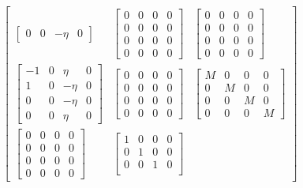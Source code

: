 \documentclass[11pt]{article} %
\begin{document}
\begin{align}
\begin{bmatrix}
\begin{bmatrix}
            0 & 0 & -\eta & 0
        \end{bmatrix}  & 
        \begin{bmatrix}
            0 & 0 & 0 & 0\\
            0 & 0 & 0 & 0\\
            0 & 0 & 0 & 0\\
            0 & 0 & 0 & 0
        \end{bmatrix}   &
        \begin{bmatrix}
            0 & 0 & 0 & 0\\
            0 & 0 & 0 & 0\\
            0 & 0 & 0 & 0\\
            0 & 0 & 0 & 0
        \end{bmatrix} \\
        \begin{bmatrix}
            -1 & 0 & \eta  & 0\\
            1 & 0 & -\eta & 0\\
            0 & 0 & -\eta & 0\\
            0 & 0 & \eta & 0
        \end{bmatrix}  & 
        \begin{bmatrix}
            0 & 0 & 0 & 0\\
            0 & 0 & 0 & 0\\
            0 & 0 & 0 & 0\\
            0 & 0 & 0 & 0
        \end{bmatrix}   &
        \begin{bmatrix}
            M & 0 & 0 & 0\\
            0 & M & 0 & 0\\
            0 & 0 & M & 0\\
            0 & 0 & 0 & M
        \end{bmatrix} \\
        \begin{bmatrix}
            0 & 0 & 0 & 0\\
            0 & 0 & 0 & 0\\
            0 & 0 & 0 & 0\\
            0 & 0 & 0 & 0
        \end{bmatrix}  & 
        \begin{bmatrix}
            1 & 0 & 0 & 0\\
            0 & 1 & 0 & 0\\
            0 & 0 & 1 & 0\\

\end{bmatrix}
\end{bmatrix}
\end{align}
\end{document}
